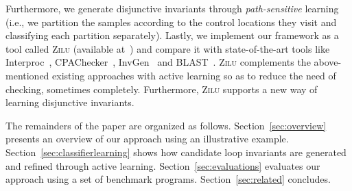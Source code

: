Furthermore, we generate disjunctive invariants through {\em path-sensitive} learning (i.e., we partition the samples according to the control locations they visit and classifying each partition separately). Lastly, we implement our framework as a tool called \textsc{Zilu} (available at~\cite{zilu:repo}) and compare it with state-of-the-art tools like Interproc~\cite{jeannet2010interproc}, CPAChecker~\cite{DBLP:conf/cav/BeyerK11}, InvGen~\cite{DBLP:conf/cav/GuptaR09} and BLAST~\cite{DBLP:journals/sttt/BeyerHJM07}.
\textsc{Zilu} complements the above-mentioned existing approaches with active learning so as to reduce the need of checking, sometimes completely. Furthermore, \textsc{Zilu} supports a new way of learning disjunctive invariants.





The remainders of the paper are organized as follows.
Section~\ref{sec:overview} presents an overview of our approach using an illustrative example.
Section~\ref{sec:classifierlearning} shows how candidate loop invariants are generated and refined through active learning.
Section~\ref{sec:evaluations} evaluates our approach using a set of benchmark programs.
Section~\ref{sec:related} concludes.

